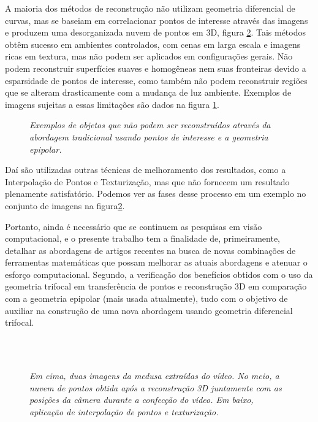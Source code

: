 A maioria dos métodos de reconstrução não utilizam geometria diferencial de curvas, mas se baseiam em correlacionar pontos de interesse através das imagens e produzem uma desorganizada nuvem de pontos em 3D, figura \ref{fig.medusa}. Tais métodos obtêm sucesso em ambientes controlados, com cenas em larga escala e imagens ricas em textura, mas não podem ser aplicados em configurações gerais. Não podem reconstruir superfícies suaves e homogêneas nem suas fronteiras devido a esparsidade de pontos de interesse, como também não podem reconstruir regiões que se alteram drasticamente com a mudança de luz ambiente. Exemplos de imagens sujeitas a essas limitações são dados na figura \ref{fig.carro-objeto-curvo}.
\begin{figure}[!htb]
\centering
{}
\quad
{}
\caption{{\it Exemplos de objetos que não podem ser reconstruídos através da abordagem tradicional usando pontos de interesse e a geometria epipolar.}}
\label{fig.carro-objeto-curvo}
\end{figure}  
Daí são utilizadas outras técnicas de melhoramento dos resultados, como a Interpolação de Pontos e Texturização, mas que não fornecem um resultado plenamente satisfatório. Podemos ver as fases desse processo em um exemplo no conjunto de imagens na figura\ref{fig.medusa}.

Portanto, ainda é necessário que se continuem as pesquisas em visão computacional, e o presente trabalho tem a finalidade de, primeiramente, detalhar as abordagens de artigos recentes na busca de novas combinações de ferramentas matemáticas que possam melhorar as atuais abordagens e atenuar o esforço computacional. Segundo, a verificação dos benefícios obtidos com o uso da geometria trifocal em transferência de pontos e reconstrução 3D em comparação com a geometria epipolar (mais usada atualmente), tudo com o objetivo de auxiliar na construção de uma nova abordagem usando geometria diferencial trifocal.

\begin{figure}[!htb]
\centering
{}
\quad
{}
\\
\quad
{}
\\
\quad
{}
\caption{{\it Em cima, duas imagens da medusa extraídas do vídeo. No meio, a nuvem de pontos obtida após a reconstrução 3D juntamente com as posições da câmera durante a confecção do vídeo. Em baixo, aplicação de interpolação de pontos e texturização.}}
\label{fig.medusa}
\end{figure}

